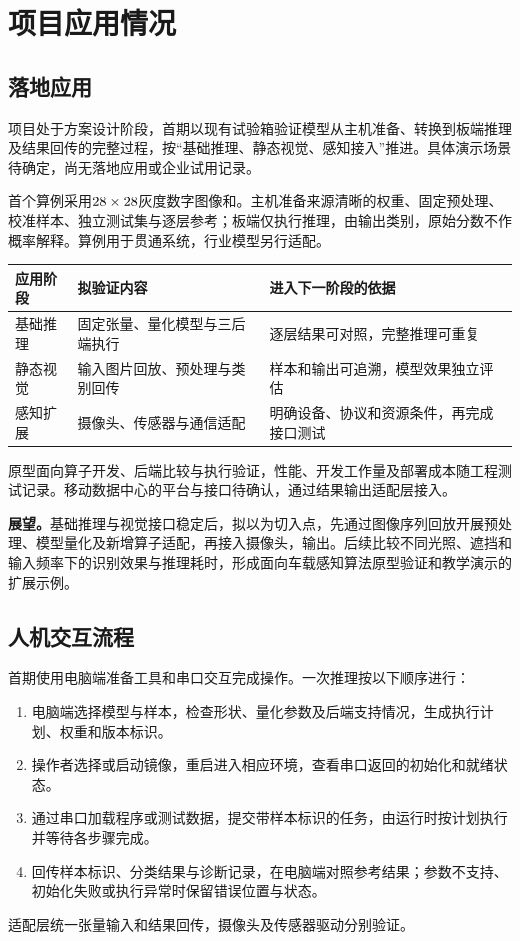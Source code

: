 \section{项目应用情况}
\subsection{落地应用}

项目处于方案设计阶段，首期以现有试验箱验证模型从主机准备、转换到板端推理及结果回传的完整过程，按“基础推理、静态视觉、感知接入”推进。具体演示场景待确定，尚无落地应用或企业试用记录。\cite{technicalreport}

首个算例采用\(28\times28\)灰度数字图像和\AIModel{}。主机准备来源清晰的权重、固定预处理、校准样本、独立测试集与逐层参考；板端仅执行推理，由\ModelOutputOperation{}输出类别，原始分数不作概率解释。算例用于贯通系统，行业模型另行适配。

{\small\renewcommand{\arraystretch}{\CompactTableStretch}
\noindent\begin{tabularx}{\linewidth}{@{}P{.19\linewidth}Y Y@{}}
\toprule
应用阶段 & 拟验证内容 & 进入下一阶段的依据 \\
\midrule
基础推理 & 固定张量、量化模型与三后端执行 & 逐层结果可对照，完整推理可重复 \\
静态视觉 & 输入图片回放、预处理与类别回传 & 样本和输出可追溯，模型效果独立评估 \\
感知扩展 & 摄像头、传感器与通信适配 & 明确设备、协议和资源条件，再完成接口测试 \\
\bottomrule
\end{tabularx}}

原型面向算子开发、后端比较与执行验证，性能、开发工作量及部署成本随工程测试记录。移动数据中心的平台与接口待确认，通过结果输出适配层接入。

\par\textbf{\DrivingExtensionDirection{}展望。}基础推理与视觉接口稳定后，拟以\DrivingPilotTask{}为切入点，先通过图像序列回放开展预处理、模型量化及新增算子适配，再接入摄像头，输出\DrivingPilotOutput{}。后续比较不同光照、遮挡和输入频率下的识别效果与推理耗时，形成面向车载感知算法原型验证和教学演示的扩展示例。

\subsection{人机交互流程}

首期使用电脑端准备工具和串口交互完成操作。一次推理按以下顺序进行：

\begin{enumerate}
\item 电脑端选择模型与样本，检查形状、量化参数及后端支持情况，生成执行计划、权重和版本标识。
\item 操作者选择\RealTimeSystem{}或\LinuxDistribution{}启动镜像，重启进入相应环境，查看串口返回的初始化和就绪状态。
\item 通过串口加载程序或测试数据，提交带样本标识的任务，由运行时按计划执行并等待各步骤完成。
\item 回传样本标识、分类结果与诊断记录，在电脑端对照参考结果；参数不支持、初始化失败或执行异常时保留错误位置与状态。
\end{enumerate}

适配层统一张量输入和结果回传，摄像头及传感器驱动分别验证。
